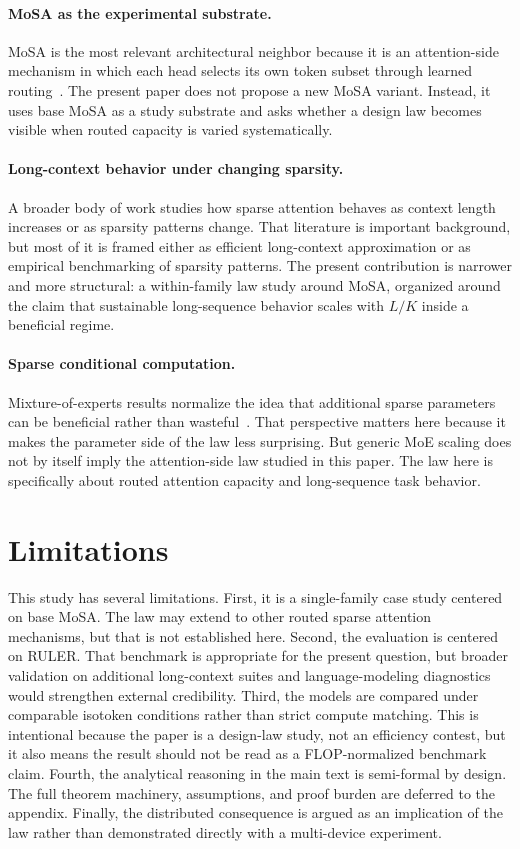 \documentclass[11pt]{article}
\begin{document}
\paragraph{MoSA as the experimental substrate.}
MoSA is the most relevant architectural neighbor because it is an attention-side mechanism in which each head selects its own token subset through learned routing~\cite{mosa}. The present paper does not propose a new MoSA variant. Instead, it uses base MoSA as a study substrate and asks whether a design law becomes visible when routed capacity is varied systematically.

\paragraph{Long-context behavior under changing sparsity.}
A broader body of work studies how sparse attention behaves as context length increases or as sparsity patterns change. That literature is important background, but most of it is framed either as efficient long-context approximation or as empirical benchmarking of sparsity patterns. The present contribution is narrower and more structural: a within-family law study around MoSA, organized around the claim that sustainable long-sequence behavior scales with $L/K$ inside a beneficial regime.

\paragraph{Sparse conditional computation.}
Mixture-of-experts results normalize the idea that additional sparse parameters can be beneficial rather than wasteful~\cite{switch}. That perspective matters here because it makes the parameter side of the law less surprising. But generic MoE scaling does not by itself imply the attention-side law studied in this paper. The law here is specifically about routed attention capacity and long-sequence task behavior.

\section{Limitations}

This study has several limitations. First, it is a single-family case study centered on base MoSA. The law may extend to other routed sparse attention mechanisms, but that is not established here. Second, the evaluation is centered on RULER. That benchmark is appropriate for the present question, but broader validation on additional long-context suites and language-modeling diagnostics would strengthen external credibility. Third, the models are compared under comparable isotoken conditions rather than strict compute matching. This is intentional because the paper is a design-law study, not an efficiency contest, but it also means the result should not be read as a FLOP-normalized benchmark claim. Fourth, the analytical reasoning in the main text is semi-formal by design. The full theorem machinery, assumptions, and proof burden are deferred to the appendix. Finally, the distributed consequence is argued as an implication of the law rather than demonstrated directly with a multi-device experiment.
\end{document}
